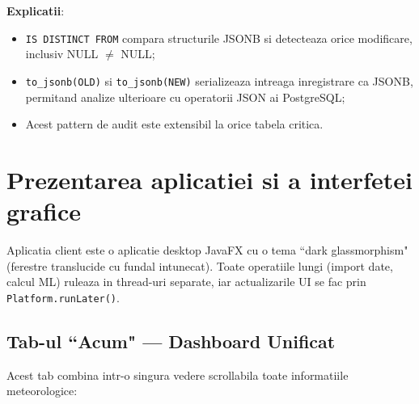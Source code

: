 \documentclass[12pt,a4paper]{article}
\begin{document}
\textbf{Explicatii}:
\begin{itemize}[noitemsep]
    \item \texttt{IS DISTINCT FROM} compara structurile JSONB si detecteaza orice modificare, inclusiv NULL $\neq$ NULL;
    \item \texttt{to\_jsonb(OLD)} si \texttt{to\_jsonb(NEW)} serializeaza intreaga inregistrare ca JSONB, permitand analize ulterioare cu operatorii JSON ai PostgreSQL;
    \item Acest pattern de audit este extensibil la orice tabela critica.
\end{itemize}

\vspace{0.8cm}

\section{Prezentarea aplicatiei si a interfetei grafice}

Aplicatia client este o aplicatie desktop JavaFX cu o tema ``dark glassmorphism" (ferestre translucide cu fundal intunecat). Toate operatiile lungi (import date, calcul ML) ruleaza in thread-uri separate, iar actualizarile UI se fac prin \texttt{Platform.runLater()}.

\subsection{Tab-ul ``Acum" --- Dashboard Unificat}

Acest tab combina intr-o singura vedere scrollabila toate informatiile meteorologice:
\end{document}
